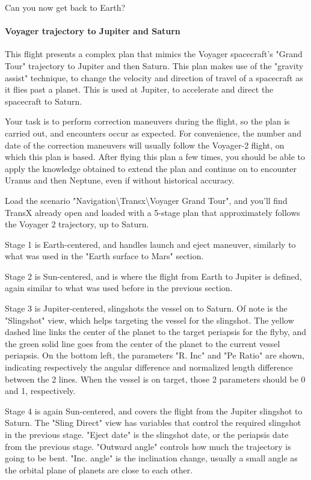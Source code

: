 \documentclass[Orbiter User Manual.tex]{subfiles}
\begin{document}
Can you now get back to Earth?


\paragraph{Voyager trajectory to Jupiter and Saturn}
This flight presents a complex plan that mimics the Voyager spacecraft's "Grand
Tour" trajectory to Jupiter and then Saturn. This plan makes use of the
"gravity assist" technique, to change the velocity and direction of travel of a
spacecraft as it flies past a planet. This is used at Jupiter, to accelerate and
direct the spacecraft to Saturn.

Your task is to perform correction maneuvers during the flight, so the plan is
carried out, and encounters occur as expected. For convenience, the number and
date of the correction maneuvers will usually follow the Voyager-2 flight, on
which this plan is based. After flying this plan a few times, you should be able
to apply the knowledge obtained to extend the plan and continue on to encounter
Uranus and then Neptune, even if without historical accuracy.

Load the scenario "Navigation\textbackslash Transx\textbackslash Voyager Grand
Tour", and you'll find TransX already open and loaded with a 5-stage plan that
approximately follows the Voyager 2 trajectory, up to Saturn.

Stage 1 is Earth-centered, and handles launch and eject maneuver, similarly to
what was used in the "Earth surface to Mars" section.

Stage 2 is Sun-centered, and is where the flight from Earth to Jupiter is
defined, again similar to what was used before in the previous section.

Stage 3 is Jupiter-centered, slingshots the vessel on to Saturn. Of note is the
"Slingshot" view, which helps targeting the vessel for the slingshot. The yellow
dashed line links the center of the planet to the target periapsis for the
flyby, and the green solid line goes from the center of the planet to the
current vessel periapsis. On the bottom left, the parameters "R. Inc" and "Pe
Ratio" are shown, indicating respectively the angular difference and normalized
length difference between the 2 lines. When the vessel is on target, those 2
parameters should be 0 and 1, respectively.

Stage 4 is again Sun-centered, and covers the flight from the Jupiter slingshot
to Saturn. The "Sling Direct" view has variables that control the required
slingshot in the previous stage. "Eject date" is the slingshot date, or the
periapsis date from the previous stage. "Outward angle" controls how much the
trajectory is going to be bent. "Inc. angle" is the inclination change, usually
a small angle as the orbital plane of planets are close to each other.
\end{document}
